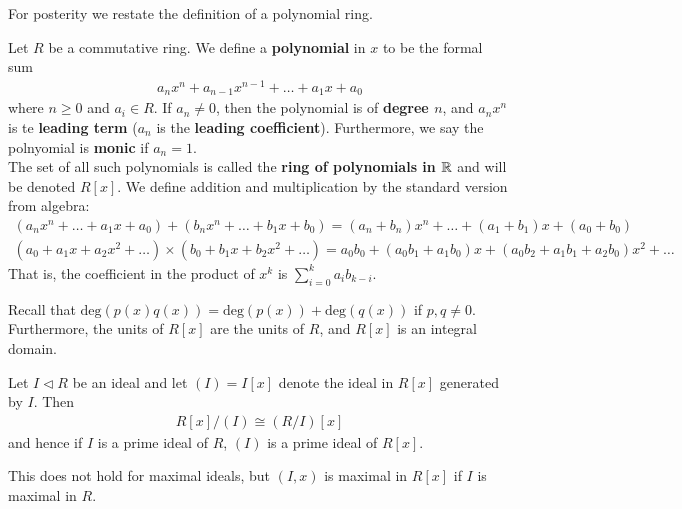 \documentclass{memoir}
\begin{document}


For posterity we restate the definition of a polynomial ring.

\begin{defn}
	Let \(R\) be a commutative ring. We define a \textbf{polynomial} in \(x\) to be the formal sum
	\begin{align*}
		a_n x^{n} + a_{n-1}x^{n-1} + \ldots + a_1 x + a_0
	\end{align*}
	where \(n\geq 0\) and \(a_i \in R\). If \(a_n \neq 0\), then the polynomial is of \textbf{degree \(n\)}, and \(a_nx^{n}\) is te \textbf{leading term} (\(a_n\) is the \textbf{leading coefficient}). Furthermore, we say the polnyomial is \textbf{monic} if \(a_n=1\).\\

	The set of all such polynomials is called the \textbf{ring of polynomials in \(\mathbb{R}\)} and will be denoted \(R[x]\). We define addition and multiplication by the standard version from algebra:
	\begin{align*}
		(a_nx^{n} + \ldots + a_1x + a_0) + (b_nx^{n} + \ldots + b_1x + b_0) = (a_n+b_n)x^{n} + \ldots + (a_1+b_1)x + (a_0 + b_0)\\
		(a_0+a_1x + a_2x^2+\ldots) \times (b_0 + b_1x + b_2x^2 + \ldots) = a_0b_0 + (a_0b_1 + a_1b_0)x + (a_0b_2 + a_1b_1 + a_2b_0)x^2 + \ldots
	\end{align*}
	That is, the coefficient in the product of \(x^{k}\) is \(\sum_{i=0}^{k} a_i b_{k-i}\).
\end{defn}
Recall that \(\textrm{deg}(p(x)q(x)) = \textrm{deg}(p(x)) + \textrm{deg}(q(x))\) if \(p,q \neq 0\). Furthermore, the units of \(R[x]\) are the units of \(R\), and \(R[x]\) is an integral domain.

\begin{prop}
	Let \(I\triangleleft R\) be an ideal and let \(\left( I \right) = I[x]\) denote the ideal in \(R[x]\) generated by \(I\). Then
	\begin{align*}
		R[x] / (I) \cong (R / I)[x]
	\end{align*}
	and hence if \(I\) is a prime ideal of \(R\), \((I)\) is a prime ideal of \(R[x]\).
\end{prop}
This does not hold for maximal ideals, but \((I,x)\) is maximal in \(R[x]\) if \(I\) is maximal in \(R\).
\end{document}
